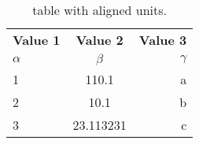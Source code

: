 \documentclass{article}
\begin{document}
	
	\begin{table}[h!]
		\begin{center}
			\caption{table with aligned units.}
			\label{tab:table1}
			\begin{tabular}{l|c|r}%
				\textbf{Value 1} & \textbf{Value 2} &
				\textbf{Value 3}\\
				$\alpha$ & $\beta$ & $\gamma$\\
				\hline
				1 & 110.1 & a\\
				2 & 10.1 & b\\
				3 & 23.113231 & c\\
			\end{tabular}
		\end{center}
	\end{table}
\end{document}
